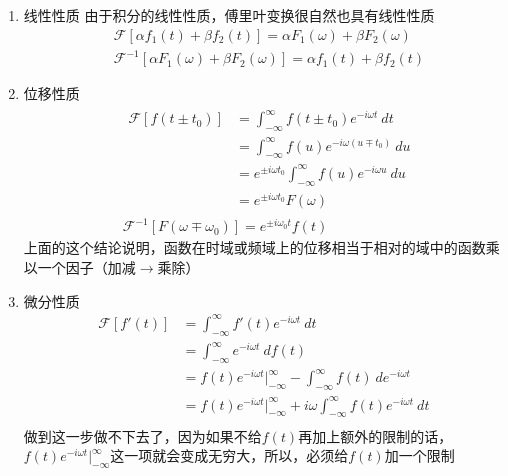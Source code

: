         \begin{enumerate}
            \item{线性性质}
                由于积分的线性性质，傅里叶变换很自然也具有线性性质
                \begin{equation}
                    \begin{split}
                        &\mathscr{F}[\alpha f_1(t)+\beta f_2(t)] = \alpha F_1(\omega)+\beta F_2(\omega)\\
                        &\mathscr{F}^{-1}[\alpha F_1(\omega)+\beta F_2(\omega)] = \alpha f_1(t)+\beta f_2(t)
                    \end{split}
                    \label{eq: 1.18}
                \end{equation}

            \item{位移性质}
                \begin{equation}
                    \begin{split}
                        &\begin{split}
                            \mathscr{F}[f(t\pm t_0)]&=\int_{-\infty}^{\infty}f(t\pm t_0)e^{-i\omega t}\ dt\\
                            &= \int_{-\infty}^{\infty}f(u)e^{-i\omega (u\mp t_0)}\ du\\
                            &= e^{\pm i\omega t_0}\int_{-\infty}^{\infty}f(u)e^{-i\omega u}\ du\\
                            &= e^{\pm i\omega t_0}F(\omega)
                        \end{split}\\
                        &\mathscr{F}^{-1}[F(\omega\mp\omega_0)]=e^{\pm i\omega_0 t}f(t)
                    \end{split}
                    \label{eq: 1.19}
                \end{equation}
                上面的这个结论说明，函数在时域或频域上的位移相当于相对的域中的函数乘以一个因子（加减$\to$乘除）

            \item{微分性质}
                \begin{equation}
                    \begin{split}
                        \mathscr{F}[f'(t)]&=\int_{-\infty}^{\infty}f'(t)e^{-i\omega t}\ dt\\
                        &=\int_{-\infty}^{\infty}e^{-i\omega t}\ df(t)\\
                        &=f(t)e^{-i\omega t}|_{-\infty}^{\infty}-\int_{-\infty}^{\infty}f(t)\ de^{-i\omega t}\\
                        &=f(t)e^{-i\omega t}|_{-\infty}^{\infty}+i\omega\int_{-\infty}^{\infty}f(t)e^{-i\omega t}\ dt\\
                    \end{split}
                    \label{eq: 1.20}
                \end{equation}
                做到这一步做不下去了，因为如果不给$f(t)$再加上额外的限制的话，$f(t)e^{-i\omega t}|_{-\infty}^{\infty}$这一项就会变成无穷大，所以，必须给$f(t)$加一个限制
    

\end{enumerate}
